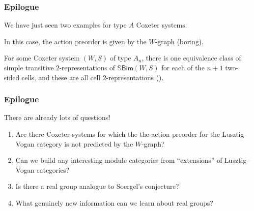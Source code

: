 \documentclass{beamer}
\newcommand{\textcat}[1]{\mathrm{\textsf{#1}}}
\begin{document}
\begin{frame}
\frametitle{Epilogue}
\noindent We have just seen two examples for type $A$ Coxeter systems.\newline

\noindent In this case, the action preorder is given by the $W$-graph (boring).\newline

\noindent For some Coxeter system $(W, S)$ of type $A_n$, there is one equivalence class of simple transitive $2$-representations of $\mathbb{S}\textcat{Bim}(W, S)$ for each of the $n+1$ two-sided cells, and these are all \textcolor{structure}{cell $2$-representations} (\textcolor{structure}{\cite{MMMTZ23}}).
\end{frame}

\begin{frame}
\frametitle{Epilogue}
\noindent There are already lots of questions!\newline
\begin{addmargin}[0.5cm]{0pt}
\begin{enumerate}[]
\item Are there Coxeter systems for which the the action preorder for the Lusztig--Vogan category is not predicted by the $W$-graph?\vspace{0.25cm}\\
\item Can we build any interesting module categories from ``extensions'' of Lusztig--Vogan categories?\vspace{0.25cm}\\
\item Is there a real group analogue to Soergel's conjecture?\vspace{0.25cm}\\
\item \textcolor{structure}{What genuinely new information can we learn about real groups?}
\end{enumerate}
\end{addmargin}
\end{frame}



\end{document}
